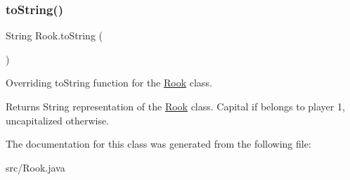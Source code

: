 \subsubsection{\texorpdfstring{to\+String()}{toString()}}
{\footnotesize\ttfamily String Rook.\+to\+String (\begin{DoxyParamCaption}{ }\end{DoxyParamCaption})}

Overriding to\+String function for the \mbox{\hyperlink{class_rook}{Rook}} class. \begin{DoxyReturn}{Returns}
String representation of the \mbox{\hyperlink{class_rook}{Rook}} class. Capital if belongs to player 1, uncapitalized otherwise. 
\end{DoxyReturn}


The documentation for this class was generated from the following file\+:\begin{DoxyCompactItemize}
\item 
src/Rook.\+java\end{DoxyCompactItemize}
